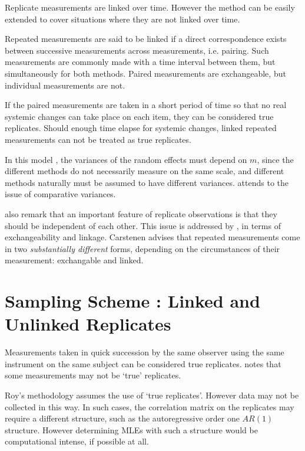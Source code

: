 \documentclass[12pt, a4paper]{report}
\theoremstyle{plain}
\theoremstyle{definition}
\theoremstyle{remark}
\begin{document}
	
	Replicate measurements are linked over time. However the method can be easily extended to cover situations where they are not linked over time.
	
	Repeated measurements are said to be linked if a direct correspondence exists between successive measurements across measurements, i.e. pairing. Such measurements are commonly made with a time interval between them, but simultaneously for both methods. Paired measurements are exchangeable, but individual measurements are not.
	
	If the paired measurements are taken
	in a short period of time so that no real systemic changes can take place on each item, they can be considered true replicates.
	Should enough time elapse for systemic changes, linked repeated measurements can not be treated as true replicates.
	
	
	
	
	In this model , the variances of the random effects must depend on
	$m$, since the different methods do not necessarily measure on the
	same scale, and different methods naturally must be assumed to
	have different variances. \citet{BXC2004} attends to the issue of
	comparative variances.
	
	
	
	\bigskip
	\citet{BA99} also remark that an important feature of replicate observations is that they should be independent
	of each other. This issue is addressed by \citet{BXC2010}, in terms of exchangeability and linkage. Carstenen advises that repeated measurements come in two \emph{substantially different} forms, depending on the circumstances of their measurement: exchangable and linked.
	
	

	\section{Sampling Scheme : Linked and Unlinked Replicates}
	Measurements taken in quick succession by the same observer using the same instrument on the same subject can be considered true replicates. \citet{ARoy2009} notes that some measurements may not be `true' replicates.
	
	Roy's methodology assumes the use of `true replicates'. However data may not be collected in this way. In such cases, the correlation matrix on the replicates may require a different structure, such as the autoregressive order one $AR(1)$ structure. However determining MLEs with such a structure would be computational intense, if possible at all.
	
\end{document}

